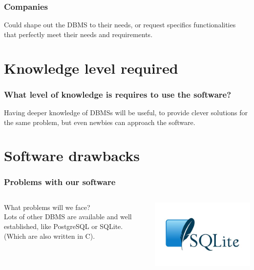 \documentclass{beamer}
\begin{document}
\begin{frame}
	\frametitle{Companies}	
	Could shape out the DBMS to their needs, or request specifics functionalities that perfectly meet their needs and requirements. 
\end{frame}

\section{Knowledge level required}
\begin{frame}
	\frametitle{What level of knowledge is requires to use the software?}
	Having deeper knowledge of DBMSs will be useful, to provide clever solutions for the same problem, but even newbies can approach the software.
\end{frame}

\section{Software drawbacks}
\begin{frame}
	\frametitle{Problems with our software}
	\begin{columns}
	\begin{column}{0.4\textwidth}
	 What problems will we face? \\ Lots of other DBMS are available and well established, like PostgreSQL or SQLite. (Which are also written in C).		
	\end{column}
		\begin{column}{0.4\textwidth}
		\includegraphics[width=\columnwidth]{sqlitelogo.jpg}
	 \end{column}
	 \end{columns}
\end{frame}
\end{document}
